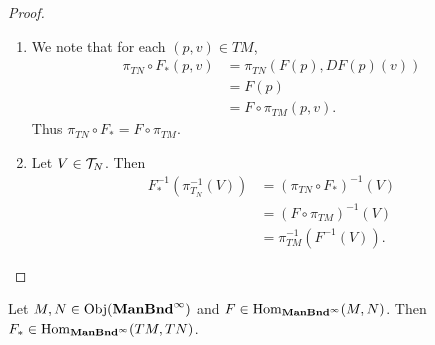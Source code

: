 \documentclass{book}
\begin{document}
\begin{proof}\
	\begin{enumerate}
		\item We note that for each $(p,v) \in TM$, 
		\begin{align*}
			\pi_{TN} \circ F_*(p, v)
			& = \pi_{TN} (F(p), DF(p)(v)) \\
			& = F(p) \\
			& = F \circ \pi_{TM}(p,v).
		\end{align*}
		Thus $\pi_{TN} \circ F_* = F \circ \pi_{TM}$.
		\item Let $V \in \mathcal{T}_N$. Then 
		\begin{align*}
			F_*^{-1}(\pi_{T_N}^{-1}(V))
			& = (\pi_{TN} \circ F_*)^{-1}(V) \\
			& = ( F \circ \pi_{TM})^{-1}(V) \\
			& = \pi_{TM}^{-1}(F^{-1}(V)).
		\end{align*}
	\end{enumerate}
\end{proof}

\begin{ex}
	Let $M,N \in \operatorname{Obj}(\operatorname*{\text{\textbf{ManBnd}}^{\infty}})$ and $F \in \operatorname{Hom}_{\operatorname*{\text{\textbf{ManBnd}}^{\infty}}}(M, N)$. Then $F_* \in \operatorname{Hom}_{\operatorname*{\text{\textbf{ManBnd}}^{\infty}}}(TM, TN)$.
\end{ex}
\end{document}
